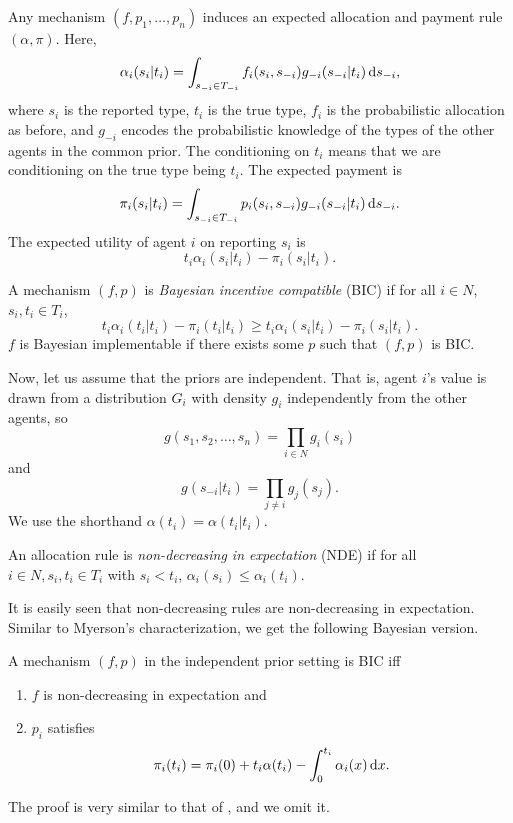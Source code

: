 		Any mechanism $(f,p_1,\ldots,p_n)$ induces an expected allocation and payment rule $(\alpha,\pi)$. Here,
		\[ \alpha_i(s_i | t_i) = \int_{s_{-i} \in T_{-i}} f_i(s_i,s_{-i}) g_{-i}(s_{-i}| t_i) \dif s_{-i}, \]
		where $s_i$ is the reported type, $t_i$ is the true type, $f_i$ is the probabilistic allocation as before, and $g_{-i}$ encodes the probabilistic knowledge of the types of the other agents in the common prior. The conditioning on $t_i$ means that we are conditioning on the true type being $t_i$. The expected payment is
		\[ \pi_i(s_i| t_i) = \int_{s_{-i} \in T_{-i}} p_i(s_i,s_{-i}) g_{-i}(s_{-i} | t_i) \dif s_{-i}. \]
		The expected utility of agent $i$ on reporting $s_i$ is
		\[ t_i \alpha_i(s_i | t_i) - \pi_i(s_i | t_i). \]

		\begin{fdef}
			A mechanism $(f,p)$ is \emph{Bayesian incentive compatible} (BIC) if for all $i \in N$, $s_i,t_i \in T_i$,
			\[ t_i \alpha_i(t_i | t_i) - \pi_i(t_i | t_i) \ge t_i \alpha_i(s_i | t_i) - \pi_i(s_i | t_i). \]
			$f$ is Bayesian implementable if there exists some $p$ such that $(f,p)$ is BIC.\\
		\end{fdef}
		Now, let us assume that the priors are independent. That is, agent $i$'s value is drawn from a distribution $G_i$ with density $g_i$ independently from the other agents, so
		\[ g(s_1,s_2,\ldots,s_n) = \prod_{i \in N} g_i(s_i) \]
		and
		\[ g(s_{-i} | t_i) = \prod_{j \ne i} g_j(s_j). \]
		We use the shorthand $\alpha(t_i) = \alpha(t_i | t_i)$.

		\begin{fdef}
			An allocation rule is \emph{non-decreasing in expectation} (NDE) if for all $i \in N, s_i,t_i \in T_i$ with $s_i < t_i$, $\alpha_i(s_i) \le \alpha_i(t_i)$.
		\end{fdef}
		It is easily seen that non-decreasing rules are non-decreasing in expectation.\\
		Similar to Myerson's characterization, we get the following Bayesian version.

		\begin{ftheo}
			\label{bic char}
			A mechanism $(f,p)$ in the independent prior setting is BIC iff
			\begin{enumerate}
				\item $f$ is non-decreasing in expectation and
				\item $p_i$ satisfies
				\[ \pi_i(t_i) = \pi_i(0) + t_i \alpha(t_i) - \int_0^{t_i} \alpha_i(x) \dif x. \]
			\end{enumerate}
		\end{ftheo}
		The proof is very similar to that of , and we omit it.

